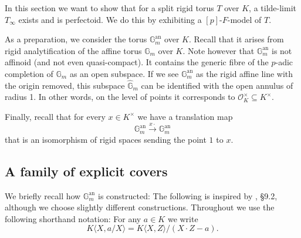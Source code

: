 \documentclass[10pt,oneside]{amsart}
\theoremstyle{definition}
\begin{document}
	In this section we want to show that for a split rigid torus $T$ over $K$, a tilde-limit $T_\infty$ exists and is perfectoid. We do this by exhibiting a $[p]$-$F$-model of $T$.
	
	As a preparation, we consider the torus $\mathbb G_m^{\operatorname{an}}$ over $K$. Recall that it arises from rigid analytification of the affine torus $\mathbb G_m$ over $K$. Note however that $\mathbb G_m^{\operatorname{an}}$ is not affinoid (and not even quasi-compact). It contains the generic fibre of the $p$-adic completion of $\mathbb G_m$ as an open subspace. If we see $\mathbb G_m^{\operatorname{an}}$ as the rigid affine line with the origin removed, this subspace $\widehat{\mathbb G}_m$ can be identified with the open annulus of radius 1. In other words, on the level of points it corresponds to $\mathcal O_K^\times \subseteq K^\times$.
	
	Finally, recall that for every $x\in K^\times$ we have a translation map
	\[\mathbb G_m^{\operatorname{an}}\xrightarrow{x\cdot} \mathbb G_m^{\operatorname{an}}\]
	that is an isomorphism of rigid spaces sending the point $1$ to $x$.
	
	\subsection{A family of explicit covers}
	We briefly recall how $\mathbb G_m^{\operatorname{an}}$ is constructed: The following is inspired by \cite{Bosch lectures}, \S 9.2, although we choose slightly different constructions. Throughout we use the following shorthand notation: For any $a\in K$ we write
	\[K\langle X,a/X\rangle = K\langle X,Z\rangle/(X\cdot Z - a). \]
	
\end{document}
